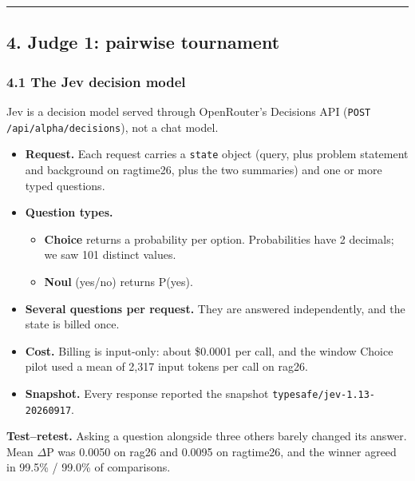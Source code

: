 \documentclass[
  10pt,
]{article}
\newcommand{\passthrough}[1]{#1}
\providecommand{\tightlist}{%
  \setlength{\itemsep}{0pt}\setlength{\parskip}{0pt}}
\begin{document}
\begin{center}\rule{0.5\linewidth}{0.5pt}\end{center}

\subsection{4. Judge 1: pairwise
tournament}\label{judge-1-pairwise-tournament}

\subsubsection{4.1 The Jev decision model}\label{the-jev-decision-model}

Jev is a decision model served through OpenRouter's Decisions API
(\passthrough{\lstinline!POST /api/alpha/decisions!}), not a chat model.

\begin{itemize}
\tightlist
\item
  \textbf{Request.} Each request carries a
  \passthrough{\lstinline!state!} object (query, plus problem statement
  and background on ragtime26, plus the two summaries) and one or more
  typed questions.
\item
  \textbf{Question types.}

  \begin{itemize}
  \tightlist
  \item
    \textbf{Choice} returns a probability per option. Probabilities have
    2 decimals; we saw 101 distinct values.
  \item
    \textbf{Noul} (yes/no) returns P(yes).
  \end{itemize}
\item
  \textbf{Several questions per request.} They are answered
  independently, and the state is billed once.
\item
  \textbf{Cost.} Billing is input-only: about \$0.0001 per call, and the
  window Choice pilot used a mean of 2,317 input tokens per call on
  rag26.
\item
  \textbf{Snapshot.} Every response reported the snapshot
  \passthrough{\lstinline!typesafe/jev-1.13-20260917!}.
\end{itemize}

\textbf{Test--retest.} Asking a question alongside three others barely
changed its answer. Mean \textbar{}\ensuremath{\Delta}P\textbar{} was
0.0050 on rag26 and 0.0095 on ragtime26, and the winner agreed in 99.5\%
/ 99.0\% of comparisons.
\end{document}
